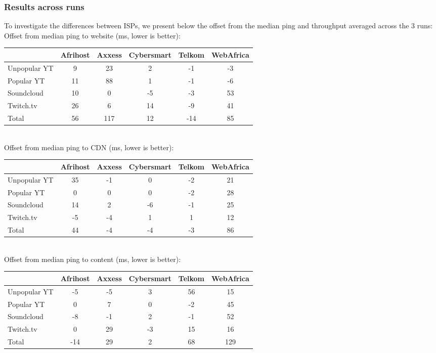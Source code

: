 \documentclass{sig-alternate-05-2015}
\begin{document}
\subsubsection{Results across runs}
To investigate the differences between ISPs, we present below the offset from the median ping and throughput averaged across the 3 runs:
\vspace{1em} \\
Offset from median ping to website (ms, lower is better): \\
\begin{tabular}{|l|c|c|c|c|c|} \hline
 & \small{Afrihost} & \small{Axxess} & \small{Cybersmart} & \small{Telkom} & \small{WebAfrica} \\ \hline
\small{Unpopular YT} & 9  & 23  & 2  & -1  & -3 \\ \hline
Popular YT           & 11 & 88  & 1  & -1  & -6 \\ \hline
Soundcloud           & 10 & 0   & -5 & -3  & 53 \\ \hline
Twitch.tv            & 26 & 6   & 14 & -9  & 41 \\ \hline
Total                & 56 & 117 & 12 & -14 & 85 \\ \hline
\end{tabular}
\vspace{1em} \\
Offset from median ping to CDN (ms, lower is better): \\
\begin{tabular}{|l|c|c|c|c|c|} \hline
 & \small{Afrihost} & \small{Axxess} & \small{Cybersmart} & \small{Telkom} & \small{WebAfrica} \\ \hline
\small{Unpopular YT} & 35 & -1 & 0  & -2 & 21 \\ \hline
Popular YT           & 0  & 0  & 0  & -2 & 28 \\ \hline
Soundcloud           & 14 & 2  & -6 & -1 & 25 \\ \hline
Twitch.tv            & -5 & -4 & 1  & 1  & 12 \\ \hline
Total                & 44 & -4 & -4 & -3 & 86 \\ \hline
\end{tabular}
\vspace{1em} \\
Offset from median ping to content (ms, lower is better): \\
\begin{tabular}{|l|c|c|c|c|c|} \hline
 & \small{Afrihost} & \small{Axxess} & \small{Cybersmart} & \small{Telkom} & \small{WebAfrica} \\ \hline
\small{Unpopular YT} & -5  & -5 & 3  & 56 & 15 \\ \hline
Popular YT           & 0   & 7  & 0  & -2 & 45 \\ \hline
Soundcloud           & -8  & -1 & 2  & -1 & 52 \\ \hline
Twitch.tv            & 0   & 29 & -3 & 15 & 16 \\ \hline
Total                & -14 & 29 & 2  & 68 & 129 \\ \hline
\end{tabular}
\end{document}
